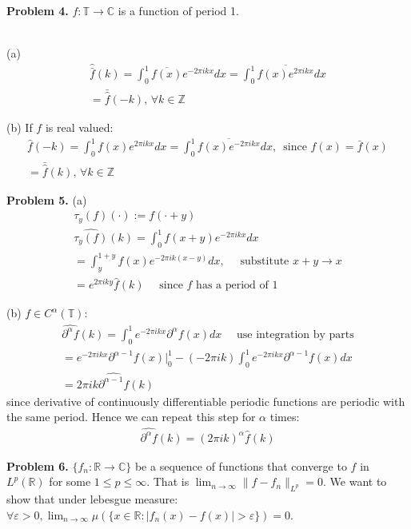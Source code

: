 \documentclass{article}
\newcommand{\R}{\mathbb{R}}
\newcommand{\Z}{\mathbb{Z}}
\newcommand{\C}{\mathbb{C}}
\newcommand{\T}{\mathbb{T}}
\begin{document}
\textbf{Problem 4. } $f: \mathbb{T} \rightarrow \mathbb{C}$ is a function of period 1.
\\~

(a)
\begin{gather*}
    \hat{\bar{f}}(k) = \int_{0}^1 \overline{f(x)}e^{-2\pi ikx}dx = \int_{0}^1 \overline{f(x) e^{2\pi ikx}}dx\\
    = \bar{\hat{f}}(-k),\, \forall k\in\Z
\end{gather*}

(b) If $f$ is real valued:
\begin{gather*}
    \hat{f}(-k) = \int_{0}^1 f(x)e^{2\pi ikx}dx = \int_{0}^1 \overline{f(x)e^{-2\pi ikx}}dx ,\, \text{ since } f(x) = \bar{f}(x)\\
    = \bar{\hat{f}}(k), \, \forall k \in \Z
\end{gather*}

\textbf{Problem 5. } (a)
\begin{gather*}
    \tau_y(f)(\cdot) := f(\cdot + y)\\
    \widehat{\tau_y(f)}(k) = \int_0^1f(x + y) e^{-2\pi ikx} dx\\
    = \int_{y}^{1+y}f(x)e^{-2\pi i k (x-y)}dx, \quad \text{ substitute } x +y \rightarrow x\\
    = e^{2\pi iky} \hat{f}(k) \quad \text{ since } f \text{ has a period of 1}
\end{gather*}

(b) $f \in C^{\alpha}(\T)$:
\begin{gather*}
    \widehat{\partial^{\alpha}f}(k) = \int_{0}^{1} e^{-2\pi ikx} \partial^{\alpha}f(x)dx \quad \text{ use integration by parts}\\
    = e^{-2\pi ikx} \partial^{\alpha-1}f(x) \rvert_{0}^1 - (-2\pi ik)\int_{0}^{1} e^{-2\pi ikx} \partial^{\alpha-1}f(x)dx\\
    = 2\pi ik \widehat{\partial^{\alpha-1}f}(k)
\end{gather*}
since derivative of continuously differentiable periodic functions are periodic with the same period. Hence we can repeat this step for $\alpha$ times:
\begin{gather*}
    \widehat{\partial^{\alpha}f}(k) = (2\pi ik)^{\alpha} \widehat{f}(k)
\end{gather*}

\textbf{Problem 6. } $\{f_n:\R\rightarrow\C\}$ be a sequence of functions that converge to $f$ in $L^p(\R)$ for some $1 \leq p\leq \infty$. That is $\lim_{n\rightarrow\infty} \lVert f - f_n\rVert_{L^p} = 0$. We want to show that under lebesgue measure: $\forall \varepsilon > 0, \lim_{n\rightarrow\infty} \mu(\{x \in\R: |f_n(x) -f(x)| > \varepsilon\}) = 0$.
\\~
\end{document}
